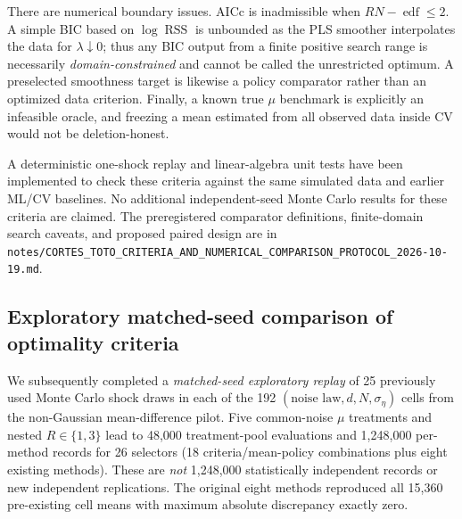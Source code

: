 \documentclass[11pt]{article}
\begin{document}
There are numerical boundary issues. AICc is
inadmissible when $RN-\operatorname{edf}\le2$.
A simple BIC based on $\log\operatorname{RSS}$
is unbounded as the PLS smoother interpolates
the data for $\lambda\downarrow0$; thus any
BIC output from a finite positive search range
is necessarily \emph{domain-constrained}
and cannot be called the unrestricted optimum.
A preselected smoothness target is likewise a
policy comparator rather than an optimized
data criterion. Finally, a known true $\mu$
benchmark is explicitly an infeasible oracle,
and freezing a mean estimated from all observed
data inside CV would not be deletion-honest.

A deterministic one-shock replay and
linear-algebra unit tests have been implemented
to check these criteria against the same
simulated data and earlier ML/CV baselines.
No additional independent-seed Monte Carlo
results for these criteria are claimed.
The preregistered comparator definitions,
finite-domain search caveats, and proposed
paired design are in
\texttt{notes/CORTES\_TOTO\_CRITERIA\_AND\_NUMERICAL\_COMPARISON\_PROTOCOL\_2026-10-19.md}.

\subsection{Exploratory matched-seed comparison of optimality criteria}

We subsequently completed a \emph{matched-seed
exploratory replay} of 25 previously used Monte Carlo
shock draws in each of the 192
$(\text{noise law},d,N,\sigma_\eta)$ cells
from the non-Gaussian mean-difference pilot.
Five common-noise $\mu$ treatments and nested
$R\in\{1,3\}$ lead to 48,000 treatment-pool
evaluations and 1,248,000 per-method records
for 26 selectors (18 criteria/mean-policy
combinations plus eight existing methods).
These are \emph{not} 1,248,000 statistically
independent records or new independent replications.
The original eight methods reproduced all
15,360 pre-existing cell means with
maximum absolute discrepancy exactly zero.
\end{document}
